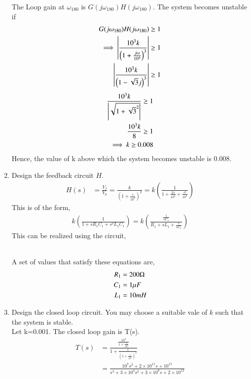 \begin{enumerate}[label=\arabic*.,ref=\theenumi]
The Loop gain at $\omega_{180}$ is $G(j\omega_{180})H(j\omega_{180})$.
 The system becomes unstable if 
\begin{align}
G(j\omega_{180})H(j\omega_{180})\geq 1 \\
\implies \left\vert\frac{10^3k}{\left(1+\frac{j\omega}{10^4}\right)^3}\right\vert \geq 1\\
\left\vert\frac{10^3k}{\left(1-\sqrt{3}j\right)^3} \right\vert \geq 1
\end{align}
\begin{align}
     \frac{10^3k}{\left\vert\sqrt{1+{\sqrt{3}}^2}\right\vert} \geq 1\\
     \frac{10^3k}{8} \geq 1 \\
     \implies k \geq 0.008
\end{align}
Hence, the value of k above which the system becomes unstable is 0.008. 
\item Design the feedback circuit $H$. \\
\solution
\begin{align}
H(s)&=\frac{V_f}{V_0}= \frac{k}{\left(1+\frac{s}{10^4}\right)^2} = k\left({\frac{1}{1+\frac{2s}{10^4}+\frac{s^2}{10^8}}}\right)  
\end{align}
This is of the form,
\begin{align}
k\left(\frac{1}{1+s{R_1}{C_1}+{s^2}{L_1}{C_1}}\right) =  k\left(\frac{\frac{1}{s{C_1}}}{{R_1}+s{L_1}+\frac{1}{s{C_1}}}\right)  
\end{align}
This can be realized using the circuit,
\begin{figure}[!ht]
	\begin{center}
		\resizebox{\columnwidth}{!}{}
	\end{center}
\caption{}
\label{fig:ee18btech11006_2}
\end{figure} \\
A set of values that satisfy these equations are,
\begin{align}
R_1&= 200\ohm \\
C_1&= 1\mu F\\
L_1&= 10mH 
\end{align}
\item Design the closed loop circuit.  You may choose a suitable vale of $k$ such that the system is stable.\\
\solution Let k=0.001. The closed loop gain is T(s).
\begin{align}
    T(s)&=\frac{\frac{10^3}{1+\frac{s}{10^4}}}{1+\frac{1}{\left(1+\frac{s}{10^4}\right)^3}}\\
    &=\frac{10^7s^2+2\times10^{11}s+10^{15}}{s^3+3\times10^4s^2+3\times10^8s+2\times10^{12}}

\end{align}
\end{enumerate}
